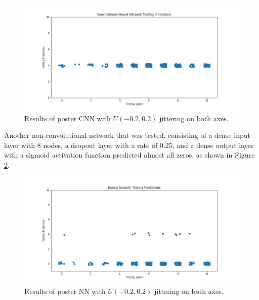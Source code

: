 \documentclass[12pt, oneside]{article}   	%
\begin{document}
\begin{figure}[H]
\includegraphics[width=\textwidth]{cnn_all_fours}
\caption{\label{fig:cnn_all_fours}Results of poster CNN with $U(-0.2, 0.2)$ jittering on both axes.}
\end{figure}

Another non-convolutional network that was tested, consisting of a dense input layer with 8 nodes, a dropout layer with a rate of 0.25, and a dense output layer with a sigmoid activation function predicted almost all zeros, as shown in Figure \ref{fig:nn_most_zeros}.

\begin{figure}[H]
\includegraphics[width=\textwidth]{nn_most_zeros}
\caption{\label{fig:nn_most_zeros}Results of poster NN with $U(-0.2, 0.2)$ jittering on both axes.}
\end{figure}
\end{document}
